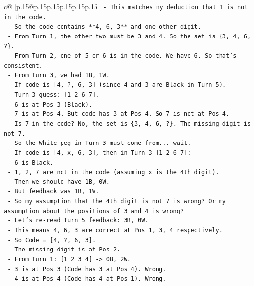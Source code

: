 \documentclass{article}
\begin{document}
{\begin{supertabular}{c@{$\;$}|p{.15\linewidth}@{}p{.15\linewidth}p{.15\linewidth}p{.15\linewidth}p{.15\linewidth}p{.15\linewidth}}
{{{\texttt{  {-} This matches my deduction that 1 is not in the code.} \\
\texttt{  {-} So the code contains **4, 6, 3** and one other digit.} \\
\texttt{  {-} From Turn 1, the other two must be 3 and 4. So the set is \{3, 4, 6, ?\}.} \\
\texttt{  {-} From Turn 2, one of 5 or 6 is in the code. We have 6. So that's consistent.} \\
\texttt{  {-} From Turn 3, we had 1B, 1W.} \\
\texttt{    {-} If code is {[}4, ?, 6, 3{]} (since 4 and 3 are Black in Turn 5).} \\
\texttt{    {-} Turn 3 guess: {[}1 2 6 7{]}.} \\
\texttt{    {-} 6 is at Pos 3 (Black).} \\
\texttt{    {-} 7 is at Pos 4. But code has 3 at Pos 4. So 7 is not at Pos 4.} \\
\texttt{    {-} Is 7 in the code? No, the set is \{3, 4, 6, ?\}. The missing digit is not 7.} \\
\texttt{    {-} So the White peg in Turn 3 must come from... wait.} \\
\texttt{    {-} If code is {[}4, x, 6, 3{]}, then in Turn 3 {[}1 2 6 7{]}:} \\
\texttt{      {-} 6 is Black.} \\
\texttt{      {-} 1, 2, 7 are not in the code (assuming x is the 4th digit).} \\
\texttt{      {-} Then we should have 1B, 0W.} \\
\texttt{      {-} But feedback was 1B, 1W.} \\
\texttt{      {-} So my assumption that the 4th digit is not 7 is wrong? Or my assumption about the positions of 3 and 4 is wrong?} \\
\texttt{  {-} Let's re{-}read Turn 5 feedback: 3B, 0W.} \\
\texttt{    {-} This means 4, 6, 3 are correct at Pos 1, 3, 4 respectively.} \\
\texttt{    {-} So Code = {[}4, ?, 6, 3{]}.} \\
\texttt{    {-} The missing digit is at Pos 2.} \\
\texttt{    {-} From Turn 1: {[}1 2 3 4{]} {-}> 0B, 2W.} \\
\texttt{      {-} 3 is at Pos 3 (Code has 3 at Pos 4). Wrong.} \\
\texttt{      {-} 4 is at Pos 4 (Code has 4 at Pos 1). Wrong.} \\
}}}
\end{supertabular}}
\end{document}
